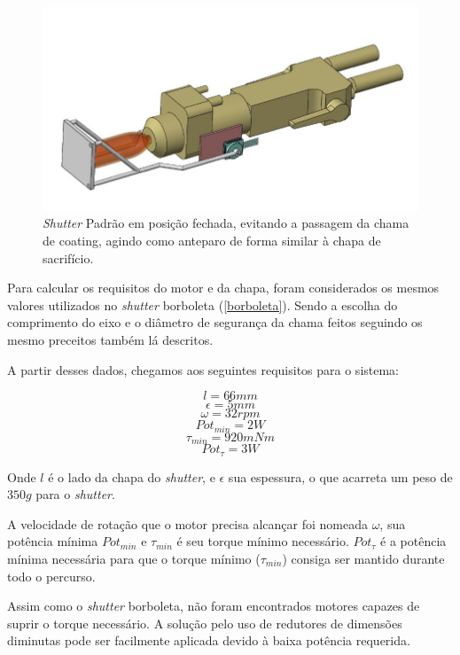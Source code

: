 \begin{figure}[h!]
\centering
	\includegraphics[width=\columnwidth]{figs/estudo/shutter/Padrao_fechado}
	\caption{\textit{Shutter} Padrão em posição fechada, evitando a passagem da
	chama de coating, agindo como anteparo de forma similar à chapa de sacrifício.}
	\label{fig::padrao_fechado}
\end{figure}

Para calcular os requisitos do motor e da chapa, foram considerados os mesmos
valores utilizados no \textit{shutter} borboleta (\ref{borboleta}). Sendo a
escolha do comprimento do eixo e o diâmetro de segurança da chama feitos
seguindo os mesmo preceitos também lá descritos.

A partir desses dados, chegamos aos seguintes requisitos para o sistema:

\[ l = 66 mm\]
\[ \epsilon = 5 mm\]
\[ \omega = 32 rpm\]
\[ {Pot}_{min} = 2 W \]
\[ \tau_{min} = 920 mNm \]
\[ Pot_{\tau} = 3 W \]


Onde $l$ é o lado da chapa do \textit{shutter}, e $\epsilon$ sua espessura, o
que acarreta um peso de $350 g$ para o \textit{shutter}.

A velocidade de rotação que o motor precisa alcançar foi nomeada $\omega$, sua
potência mínima $Pot_{min}$ e $\tau_{min}$ é seu torque mínimo necessário.
$Pot_{\tau}$ é a potência mínima necessária para que o torque mínimo
($\tau_{min}$) consiga ser mantido durante todo o percurso.

Assim como o \textit{shutter} borboleta, não foram encontrados motores
capazes de suprir o torque necessário. A solução pelo uso de redutores de
dimensões diminutas pode ser facilmente aplicada devido à baixa potência
requerida.
